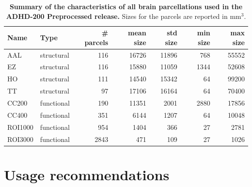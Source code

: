 \documentclass[preprint,12pt,3p]{elsarticle}
\begin{document}
\begin{table}[htbp]
\label{tab_parcellations}
\caption{{\bf Summary of the characteristics of all brain parcellations used in the ADHD-200 Preprocessed release.} Sizes for the parcels are reported in mm$^3$.}
\begin{tabular}{llrrrrr}
Name & Type & \# parcels & mean size & std size & min size & max size \\
\hline
AAL	    & structural &  116 &  16726 & 11896 &  768 & 55552\\
EZ	    & structural &  116 &  15880 & 11059 & 1344 & 52608\\
HO	    & structural &  111 &  14540 & 15342 &   64 & 99200\\
TT	    & structural & 	 97 &  17106 & 16164 &   64 & 70400\\
CC200   & functional &  190 &  11351 &  2001 & 2880 & 17856\\
CC400   & functional &  351 &   6144 &  1207 &   64 & 10048\\
ROI1000 & functional &  954 &   1404 &   366 &   27 & 2781\\
ROI3000	& functional & 2843	&    471 &   109 &   27 & 1026\\
\end{tabular}
\end{table}


\section{Usage recommendations}
\end{document}
